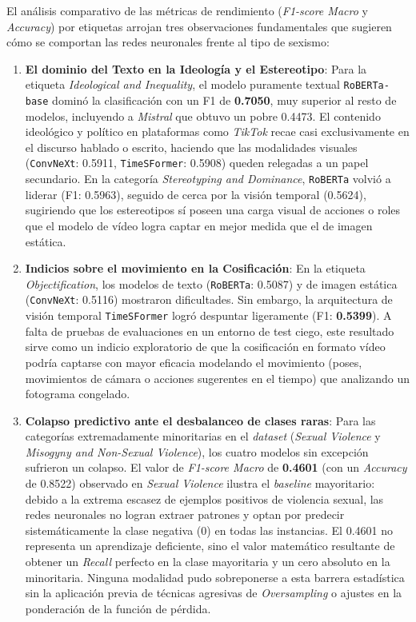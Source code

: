 El análisis comparativo de las métricas de rendimiento (\textit{F1-score Macro} y \textit{Accuracy}) por etiquetas arrojan tres observaciones fundamentales que sugieren cómo se comportan las redes neuronales frente al tipo de sexismo:
\begin{enumerate}
    \item \textbf{El dominio del Texto en la Ideología y el Estereotipo}: Para la etiqueta \textit{Ideological and Inequality}, el modelo puramente textual \texttt{RoBERTa-base} dominó la clasificación con un F1 de \textbf{0.7050}, muy superior al resto de modelos, incluyendo a \textit{Mistral} que obtuvo un pobre 0.4473. El contenido ideológico y político en plataformas como \textit{TikTok} recae casi exclusivamente en el discurso hablado o escrito, haciendo que las modalidades visuales (\texttt{ConvNeXt}: 0.5911, \texttt{TimeSFormer}: 0.5908) queden relegadas a un papel secundario. En la categoría \textit{Stereotyping and Dominance}, \texttt{RoBERTa} volvió a liderar (F1: 0.5963), seguido de cerca por la visión temporal (0.5624), sugiriendo que los estereotipos sí poseen una carga visual de acciones o roles que el modelo de vídeo logra captar en mejor medida que el de imagen estática.
    \item \textbf{Indicios sobre el movimiento en la Cosificación}: En la etiqueta \textit{Objectification}, los modelos de texto (\texttt{RoBERTa}: 0.5087) y de imagen estática (\texttt{ConvNeXt}: 0.5116) mostraron dificultades. Sin embargo, la arquitectura de visión temporal \texttt{TimeSFormer} logró despuntar ligeramente (F1: \textbf{0.5399}). A falta de pruebas de evaluaciones en un entorno de test ciego, este resultado sirve como un indicio exploratorio de que la cosificación en formato vídeo podría captarse con mayor eficacia modelando el movimiento (poses, movimientos de cámara o acciones sugerentes en el tiempo) que analizando un fotograma congelado.
    \item \textbf{Colapso predictivo ante el desbalanceo de clases raras}: Para las categorías extremadamente minoritarias en el \textit{dataset} (\textit{Sexual Violence} y \textit{Misogyny and Non-Sexual Violence}), los cuatro modelos sin excepción sufrieron un colapso. El valor de \textit{F1-score Macro} de \textbf{0.4601} (con un \textit{Accuracy} de 0.8522) observado en \textit{Sexual Violence} ilustra el \textit{baseline} mayoritario: debido a la extrema escasez de ejemplos positivos de violencia sexual, las redes neuronales no logran extraer patrones y optan por predecir sistemáticamente la clase negativa (0) en todas las instancias. El 0.4601 no representa un aprendizaje deficiente, sino el valor matemático resultante de obtener un \textit{Recall} perfecto en la clase mayoritaria y un cero absoluto en la minoritaria. Ninguna modalidad pudo sobreponerse a esta barrera estadística sin la aplicación previa de técnicas agresivas de \textit{Oversampling} o ajustes en la ponderación de la función de pérdida.
\end{enumerate}

